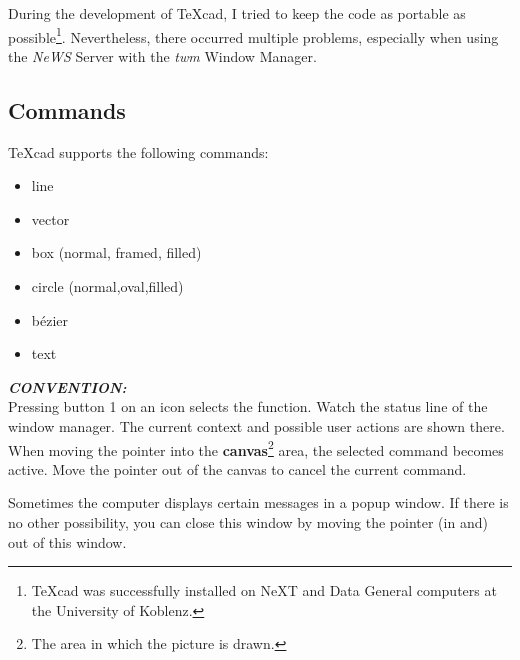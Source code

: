 During the development of TeXcad, I tried to keep the code as
portable as possible\footnote{TeXcad was successfully installed on NeXT and Data General
computers at the University of Koblenz.}.
Nevertheless, there occurred multiple 
problems, especially when using the {\it NeWS} Server with the {\it twm} Window Manager.



\subsection{Commands}

TeXcad supports the following commands:

\begin{itemize}
  \item line 
  \item vector
  \item box (normal, framed, filled)
  \item circle (normal,oval,filled) 
  \item b\'{e}zier
  \item text
\end{itemize}


     {\bf {\it CONVENTION:}}
\\
     Pressing button 1 on an icon selects the function.
     Watch the status line of the window manager. The current
     context and possible user actions are shown there.
     When moving the pointer into the {\bf canvas}\footnote{The area in which the picture is drawn.}
     area, the selected command becomes active. Move the pointer out of
     the canvas to cancel the current command.


Sometimes the computer displays certain messages in a
popup window.
If there is no other possibility, you can close this window
by moving the pointer (in and) out of this window.


